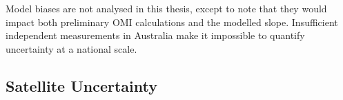     
      Model biases are not analysed in this thesis, except to note that they would impact both preliminary OMI calculations and the modelled slope. 
      Insufficient independent measurements in Australia make it impossible to quantify uncertainty %
      at a national scale.
      
    
    
    
  \subsection{Satellite Uncertainty}
    \label{BioIsop:uncertainty:satellite}
    
